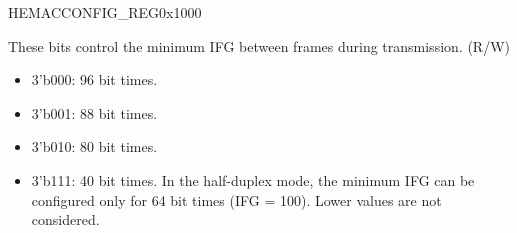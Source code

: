 \addtocounter{Regfloat}{-1}
\begin{register}{H}{EMACCONFIG\_REG}{0x1000}
\begin{regdesc}\begin{reglist}
\item [Continued from the previous page...]
\item [EMACINTERFRAMEGAP]These bits control the minimum IFG between frames during transmission. (R/W)\begin{itemize}
\item 3'b000: 96 bit times.\item 3'b001: 88 bit times.\item 3'b010: 80 bit times.\item 3'b111: 40 bit times. In the half-duplex mode, the minimum IFG can be configured only for 64 bit times (IFG = 100). Lower values are not considered. \end{itemize}


\end{reglist}
\end{regdesc}
\end{register}
